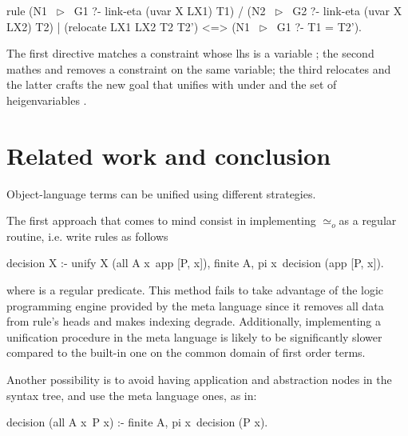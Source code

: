 \documentclass[sigconf,natbib=false,review]{acmart}
\newcommand{\UnifRel}{\ensuremath{\simeq}}
\newcommand{\Uo}{\texorpdfstring{\ensuremath{\UnifRel_o}\xspace}{unif\_o}}
\newcommand{\lhs}{lhs\xspace}
\begin{document}
\begin{elpicode}
  rule (N1 ~$\triangleright$~ G1 ?- link-eta (uvar X LX1) T1)   %
    /  (N2 ~$\triangleright$~ G2 ?- link-eta (uvar X LX2) T2)   %
    |  (relocate LX1 LX2 T2 T2')               %
   <=> (N1 ~$\triangleright$~ G1 ?- T1 = T2').                  %
\end{elpicode}

\noindent
The first directive matches a constraint
whose \lhs is a variable ; the second mathes and removes
a constraint on the same variable; the third
relocates  and the latter crafts the new goal that unifies
 with  under  and the set of
heigenvariables .


\noindent
\section{Related work and conclusion}

Object-language terms can be unified using
different strategies.

The first approach that comes to mind consist in implementing \Uo as a
regular routine, i.e. write rules as follows

\begin{elpicode}
  decision X :- unify X (all A x\ app [P, x]), finite A,
    pi x\ decision (app [P, x]).
\end{elpicode}

\noindent
where  is a regular predicate.
This method fails to take advantage of the logic
programming engine provided by the meta language since
it removes all data from rule's heads and makes
indexing degrade. Additionally,
implementing a unification procedure in the meta language is likely to be significantly
slower compared to the built-in one on the common domain of first order terms.

Another possibility is to avoid having application and abstraction nodes
in the syntax tree, and use the meta language ones, as in:

\begin{elpicode}
decision (all A x\ P x) :- finite A, pi x\ decision (P x).
\end{elpicode}
\end{document}

